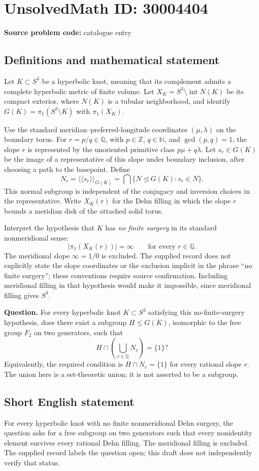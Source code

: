 \documentclass[11pt]{article}
\newcommand{\N}{\mathbb{N}}
\newcommand{\Z}{\mathbb{Z}}
\newcommand{\Q}{\mathbb{Q}}
\begin{document}
\section*{UnsolvedMath ID: 30004404}
\textbf{Source problem code:} catalogue entry
\subsection{Definitions and mathematical statement}
Let \(K\subset S^3\) be a hyperbolic knot, meaning that its complement admits a complete hyperbolic metric of finite volume. Let \(X_K=S^3\setminus\operatorname{int}N(K)\) be its compact exterior, where \(N(K)\) is a tubular neighborhood, and identify \(G(K)=\pi_1(S^3\setminus K)\) with \(\pi_1(X_K)\).

Use the standard meridian--preferred-longitude coordinates \((\mu,\lambda)\) on the boundary torus. For \(r=p/q\in\Q\), with \(p\in\Z\), \(q\in\N\), and \(\gcd(p,q)=1\), the slope \(r\) is represented by the unoriented primitive class \(p\mu+q\lambda\). Let \(s_r\in G(K)\) be the image of a representative of this slope under boundary inclusion, after choosing a path to the basepoint. Define
\[
N_r=\langle\!\langle s_r\rangle\!\rangle_{G(K)}
=\bigcap\{N\trianglelefteq G(K):s_r\in N\}.
\]
This normal subgroup is independent of the conjugacy and inversion choices in the representative. Write \(X_K(r)\) for the Dehn filling in which the slope \(r\) bounds a meridian disk of the attached solid torus.

Interpret the hypothesis that \(K\) has \emph{no finite surgery} in its standard nonmeridional sense:
\[
\bigl|\pi_1(X_K(r))\bigr|=\infty
\qquad\text{for every }r\in\Q.
\]
The meridional slope \(\infty=1/0\) is excluded. The supplied record does not explicitly state the slope coordinates or the exclusion implicit in the phrase ``no finite surgery''; these conventions require source confirmation. Including meridional filling in that hypothesis would make it impossible, since meridional filling gives \(S^3\).

\textbf{Question.} For every hyperbolic knot \(K\subset S^3\) satisfying this no-finite-surgery hypothesis, does there exist a subgroup \(H\leq G(K)\), isomorphic to the free group \(F_2\) on two generators, such that
\[
H\cap\left(\bigcup_{r\in\Q}N_r\right)=\{1\}?
\]
Equivalently, the required condition is \(H\cap N_r=\{1\}\) for every rational slope \(r\). The union here is a set-theoretic union; it is not asserted to be a subgroup.
\subsection{Short English statement}
For every hyperbolic knot with no finite nonmeridional Dehn surgery, the question asks for a free subgroup on two generators such that every nonidentity element survives every rational Dehn filling. The meridional filling is excluded. The supplied record labels the question open; this draft does not independently verify that status.
\end{document}
